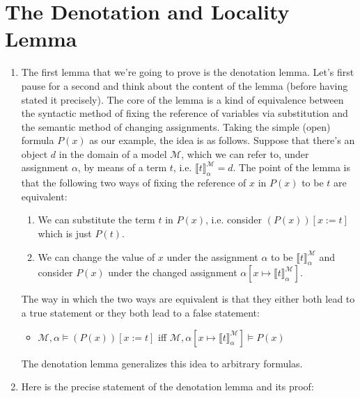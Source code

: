 	
\section{The Denotation and Locality Lemma}

	\begin{enumerate}[\thesection.1]

        \item The first lemma that we're going to prove is the
          denotation lemma. Let's first pause for a second and think
          about the content of the lemma (before having stated it
          precisely). The core of the lemma is a kind of equivalence
          between the syntactic method of fixing the reference of
          variables via substitution and the semantic method of
          changing assignments. Taking the simple (open) formula
          $P(x)$ as our example, the idea is as follows. Suppose that
          there's an object $d$ in the domain of a model $\mathcal{M}$, which we can
          refer to, under assignment $\alpha$,  by means of a term
          $t$, i.e. $\llbracket t\rrbracket^\mathcal{M}_\alpha=d$. The
          point of the lemma is that the following two ways of fixing
          the reference of $x$ in $P(x)$ to be $t$  are equivalent:
          \begin{enumerate}[1.]
          \item We can substitute the term $t$ in $P(x)$, i.e. consider
            $(P(x))[x:=t]$ which is just $P(t)$.
            \item We can change the value of $x$ under the assignment
              $\alpha$ to be $\llbracket
              t\rrbracket^\mathcal{M}_\alpha$ and consider $P(x)$
              under the changed assignment $\alpha[x\mapsto \llbracket
              t\rrbracket^\mathcal{M}_\alpha]$.
            \end{enumerate}
            The way in which the two ways are equivalent is that they
            either both lead to a true statement or they both lead to
            a false statement:
            \begin{itemize}
            \item $\mathcal{M},\alpha\vDash (P(x))[x:=t]$ iff
              $\mathcal{M},\alpha[x\mapsto \llbracket
              t\rrbracket^\mathcal{M}_\alpha]\vDash P(x)$
            \end{itemize}
          The denotation lemma generalizes this idea to arbitrary
          formulas.

          \item Here is the precise statement of the denotation lemma
            and its proof:
          

\end{enumerate}
